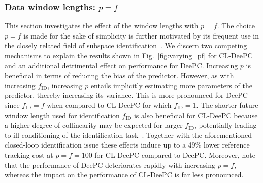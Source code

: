 \subsubsection{Data window lengths: $p=f$}
\noindent This section investigates the effect of the window lengths with $p=f$. The choice $p=f$ is made for the sake of simplicity is further motivated by its frequent use in the closely related field of subspace identification~\citep{vanderVeen2013}. We discern two competing mechanisms to explain the results shown in Fig.~\ref{fig:varying_pf} for \ac{CL-DeePC} and an additional detrimental effect on performance for \ac{DeePC}. Increasing $p$ is beneficial in terms of reducing the bias of the predictor. However, as with increasing $f_\mathrm{ID}$, increasing $p$ entails implicitly estimating more parameters of the predictor, thereby increasing its variance. This is more pronounced for \ac{DeePC} since $f_\mathrm{ID}=f$ when compared to \ac{CL-DeePC} for which $f_\mathrm{ID}=1$. The shorter future window length used for identification $f_\mathrm{ID}$ is also beneficial for \ac{CL-DeePC} because a higher degree of collinearity may be expected for larger $f_\mathrm{ID}$, potentially leading to ill-conditioning of the identification task~\citep{Chiuso2004}. Together with the aforementioned closed-loop identification issue these effects induce up to a 49\% lower reference tracking cost at $p=f=100$ for \ac{CL-DeePC} compared to \ac{DeePC}. Moreover, note that the performance of \ac{DeePC} deteriorates rapidly with increasing $p=f$, whereas the impact on the performance of \ac{CL-DeePC} is far less pronounced.
